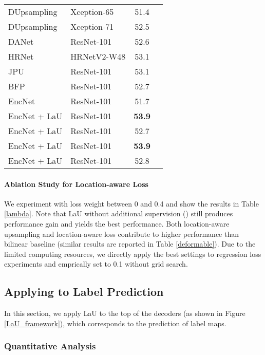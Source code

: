 \documentclass[10pt,twocolumn,letterpaper]{article}
\begin{document}
\begin{table*}[t]
\begin{subtable}{.55\linewidth}
\begin{tabular}{llcc}
         DUpsampling \cite{DUpsampling} & Xception-65 & 51.4 & \\
         DUpsampling \cite{DUpsampling} & Xception-71 & 52.5 & \\
         DANet \cite{DANet} & ResNet-101 & 52.6 & \\
	    HRNet \cite{HRR} & HRNetV2-W48  & 53.1 & \\
	    JPU \cite{JPU} & ResNet-101 & 53.1 & \\
	    BFP \cite{BFP} & ResNet-101 & 52.7 & \\
         EncNet \cite{EncNet} & ResNet-101 & 51.7 & \\
\hline
         EncNet + LaU & ResNet-101 &  \textbf{53.9} & \\
	   EncNet + LaU & ResNet-101 &  52.7 & \\
	   EncNet + LaU & ResNet-101 &  \textbf{53.9} & \\ 
	   EncNet + LaU & ResNet-101 &  52.8 & \\
\hline
        \end{tabular}
    \label{pc_res101}
    \end{subtable} 
\end{table*}


\paragraph{Ablation Study for Location-aware Loss}
We experiment with loss weight  between 0 and 0.4 and show the results in Table \ref{lambda}. Note that LaU without additional supervision () still produces  performance gain and  yields the best performance. Both location-aware upsampling and location-aware loss contribute to higher performance than bilinear baseline (similar results are reported in Table \ref{deformable}). Due to the limited computing resources, we directly apply the best settings to regression loss experiments and emprically set  to 0.1 without grid search.

\subsection{Applying to Label Prediction}
In this section, we apply LaU to the top of the decoders (as shown in Figure \ref{LaU_framework}), which corresponds to the prediction of label maps.
\subsubsection{Quantitative Analysis}
\end{document}

